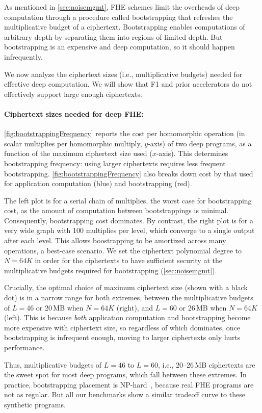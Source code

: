 As mentioned in \autoref{sec:noisemgmt}, FHE schemes
limit the overheads of deep computation through a procedure called
bootstrapping that refreshes the multiplicative budget of a ciphertext.
Bootstrapping enables computations of arbitrary depth by separating them into
regions of limited depth. But bootstrapping is an expensive and deep
computation, so it should happen infrequently.

We now analyze the ciphertext sizes (i.e., multiplicative budgets) needed for
effective deep computation. We will show that F1 and prior accelerators do not
effectively support large enough ciphertexts.

\paragraph{Ciphertext sizes needed for deep FHE:}
\autoref{fig:bootstrappingFrequency} reports the cost per homomorphic operation
(in scalar multiplies per homomorphic multiply, $y$-axis) of two deep programs,
as a function of the maximum ciphertext size used ($x$-axis). This determines
bootstrapping frequency: using larger ciphertexts requires less frequent
bootstrapping. \autoref{fig:bootstrappingFrequency} also breaks down cost by
that used for application computation (blue) and bootstrapping (red).

The left plot is for a serial chain of multiplies, the worst case for
bootstrapping cost, as the amount of computation between bootstrappings is
minimal. Consequently, bootstrapping cost dominates. By contrast, the right
plot is for a very wide graph with 100 multiplies per level, which converge to
a single output after each level. This allows boostrapping to be amortized
across many operations, a best-case scenario. We set the ciphertext polynomial degree
to $N=64K$ in order for the ciphertexts to have sufficient security at the
multiplicative budgets required for bootstrapping (\autoref{sec:noisemgmt}).

Crucially, the optimal choice of maximum ciphertext size (shown with a black
dot) is in a narrow range for both extremes, between the multiplicative budgets
of $L=46$ or 20\,MB when $N=64K$ (right), and $L=60$ or 26\,MB when $N=64K$
(left). This is because \emph{both} application computation and bootstrapping
become more expensive with ciphertext size, so regardless of which dominates,
once bootstrapping is infrequent enough, moving to larger ciphertexts only
hurts performance.

Thus, multiplicative budgets of $L=46$ to $L=60$, i.e., 20--26\,MB ciphertexts
are the sweet spot for most deep programs, which fall between these extremes.
In practice, bootstrapping placement is
NP-hard~\cite{benhamouda2017optimization}, because real FHE programs are not as
regular. But all our benchmarks show a similar tradeoff curve to these
synthetic programs.

